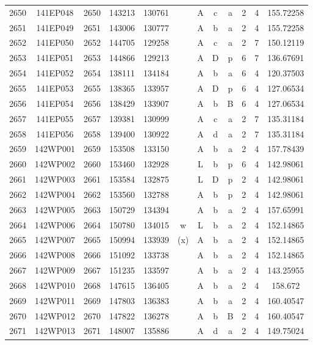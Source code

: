 \begin{tabular}{|*{12}{c|}}
2650 & 141EP048 & 2650 & 143213 & 130761 &  & A & c & a & 2 & 4 & 155.72258 \\ 
2651 & 141EP049 & 2651 & 143006 & 130777 &  & A & b & a & 2 & 4 & 155.72258 \\ 
2652 & 141EP050 & 2652 & 144705 & 129258 &  & A & c & a & 2 & 7 & 150.12119 \\ 
2653 & 141EP051 & 2653 & 144866 & 129213 &  & A & D & p & 6 & 7 & 136.67691 \\ 
2654 & 141EP052 & 2654 & 138111 & 134184 &  & A & b & a & 6 & 4 & 120.37503 \\ 
2655 & 141EP053 & 2655 & 138365 & 133957 &  & A & D & p & 6 & 4 & 127.06534 \\ 
2656 & 141EP054 & 2656 & 138429 & 133907 &  & A & b & B & 6 & 4 & 127.06534 \\ 
2657 & 141EP055 & 2657 & 139381 & 130999 &  & A & c & a & 2 & 7 & 135.31184 \\ 
2658 & 141EP056 & 2658 & 139400 & 130922 &  & A & d & a & 2 & 7 & 135.31184 \\ 
2659 & 142WP001 & 2659 & 153508 & 133150 &  & A & b & a & 2 & 4 & 157.78439 \\ 
2660 & 142WP002 & 2660 & 153460 & 132928 &  & L & b & p & 6 & 4 & 142.98061 \\ 
2661 & 142WP003 & 2661 & 153584 & 132875 &  & L & D & p & 2 & 4 & 142.98061 \\ 
2662 & 142WP004 & 2662 & 153560 & 132788 &  & A & b & p & 2 & 4 & 142.98061 \\ 
2663 & 142WP005 & 2663 & 150729 & 134394 &  & A & b & a & 2 & 4 & 157.65991 \\ 
2664 & 142WP006 & 2664 & 150780 & 134015 & w & L & b & a & 2 & 4 & 152.14865 \\ 
2665 & 142WP007 & 2665 & 150994 & 133939 & (x) & A & b & a & 2 & 4 & 152.14865 \\ 
2666 & 142WP008 & 2666 & 151092 & 133738 &  & A & b & a & 2 & 4 & 152.14865 \\ 
2667 & 142WP009 & 2667 & 151235 & 133597 &  & A & b & a & 2 & 4 & 143.25955 \\ 
2668 & 142WP010 & 2668 & 147615 & 136405 &  & A & b & a & 2 & 4 & 158.672 \\ 
2669 & 142WP011 & 2669 & 147803 & 136383 &  & A & b & a & 2 & 4 & 160.40547 \\ 
2670 & 142WP012 & 2670 & 147822 & 136278 &  & A & b & B & 2 & 4 & 160.40547 \\ 
2671 & 142WP013 & 2671 & 148007 & 135886 &  & A & d & a & 2 & 4 & 149.75024 \\ 

\end{tabular}
